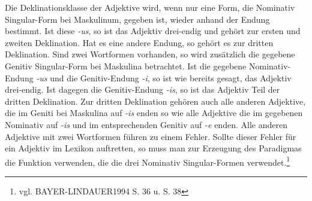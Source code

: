 \documentclass[12pt,abstract=on]{scrreprt}
\begin{document}
Die Deklinationsklasse der Adjektive wird, wenn nur eine Form, die Nominativ Singular-Form bei Maskulinum, gegeben ist, wieder anhand der Endung bestimmt. Ist diese \textit{-us}, so ist das Adjektiv drei-endig und gehört zur ersten und zweiten Deklination. Hat es eine andere Endung, so gehört es zur dritten Deklination. Sind zwei Wortformen vorhanden, so wird zusätzlich die gegebene Genitiv Singular-Form bei Maskulina betrachtet. Ist die gegebene Nominativ-Endung \textit{-us} und die Genitiv-Endung \textit{-i}, so ist wie bereits gesagt, das Adjektiv drei-endig. Ist dagegen die Genitiv-Endung \textit{-is}, so ist das Adjektiv Teil der dritten Deklination. Zur dritten Deklination gehören auch alle anderen Adjektive, die im Geniti bei Maskulina auf \textit{-is} enden so wie alle Adjektive die im gegebenen Nominativ auf \textit{-is} und im entsprechenden Genitiv auf \textit{-e} enden. Alle anderen Adjektive mit zwei Wortformen führen zu einem Fehler. Sollte dieser Fehler für ein Adjektiv im Lexikon auftretten, so muss man zur Erzeugung des Paradigmas die Funktion verwenden, die die drei Nominativ Singular-Formen verwendet.\footnote{vgl. BAYER-LINDAUER1994 S. 36 u. S. 38} \par
\end{document}

